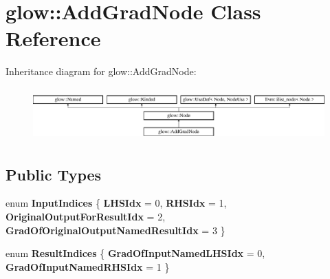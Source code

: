 \hypertarget{classglow_1_1_add_grad_node}{}\section{glow\+:\+:Add\+Grad\+Node Class Reference}
\label{classglow_1_1_add_grad_node}
Inheritance diagram for glow\+:\+:Add\+Grad\+Node\+:\begin{figure}[H]
\begin{center}
\leavevmode
\includegraphics[height=2.028986cm]{classglow_1_1_add_grad_node}
\end{center}
\end{figure}
\subsection*{Public Types}
\begin{DoxyCompactItemize}
\item 
\mbox{\label{classglow_1_1_add_grad_node_af6f1c5c5e1ce7d714884e377eb664ce3}} 
enum {\bfseries Input\+Indices} \{ {\bfseries L\+H\+S\+Idx} = 0, 
{\bfseries R\+H\+S\+Idx} = 1, 
{\bfseries Original\+Output\+For\+Result\+Idx} = 2, 
{\bfseries Grad\+Of\+Original\+Output\+Named\+Result\+Idx} = 3
 \}
\item 
\mbox{\label{classglow_1_1_add_grad_node_a32c8d235986e7825d2ac8cfed873e3fc}} 
enum {\bfseries Result\+Indices} \{ {\bfseries Grad\+Of\+Input\+Named\+L\+H\+S\+Idx} = 0, 
{\bfseries Grad\+Of\+Input\+Named\+R\+H\+S\+Idx} = 1
 \}
\end{DoxyCompactItemize}
